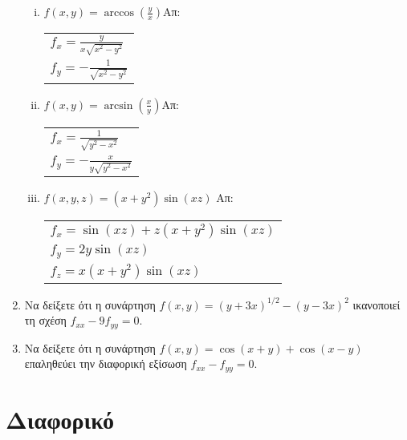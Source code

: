 \begin{enumerate}
\begin{enumerate}[i)]
      \item $f(x,y)=\arccos(\frac{y}{x})$\hfill Απ: \begin{tabular}{l}
          $f_x=\frac{y}{x\sqrt{x^2-y^2}}$ \\ 
          $f_y=-\frac{1}{\sqrt{x^2-y^2}}$
        \end{tabular}

      \item $f(x,y)=\arcsin(\frac{x}{y})$\hfill Απ: \begin{tabular}{l}
          $f_x=\frac{1}{\sqrt{y^2-x^2}}$ \\ 
          $f_y=-\frac{x}{y\sqrt{y^2-x^2}}$
        \end{tabular}

      \item $ f(x,y,z) = (x+y^{2}) \sin{(xz)} $ \hfill Απ: \begin{tabular}{l}
          $ f_{x} = \sin{(xz)} + z(x+y^{2}) \sin{(xz)} $ \\
          $ f_{y} = 2y \sin{(xz)} $ \\
          $ f_{z} = x(x+y^{2}) \sin{(xz)} $
        \end{tabular} 
    \end{enumerate}

  \item Να δείξετε ότι η συνάρτηση $ f(x,y) = (y+3x)^{1/2} - 
    (y-3x)^{2} $ ικανοποιεί τη σχέση $ f_{xx} - 9 f_{yy} = 0 $.
  \item Να δείξετε ότι η συνάρτηση $ f(x,y) = \cos{(x+y)} + \cos{(x-y)} $ 
    επαληθεύει την διαφορική εξίσωση $ f_{xx} - f_{yy} = 0 $.
\end{enumerate}


\section*{Διαφορικό}

